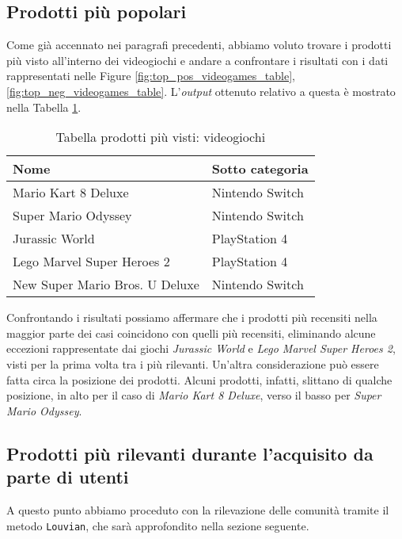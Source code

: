 	
		\subsection{Prodotti più popolari}
			Come già accennato nei paragrafi precedenti, abbiamo voluto trovare i prodotti più visto all'interno dei videogiochi e andare a confrontare i risultati con i dati rappresentati nelle Figure \ref{fig:top_pos_videogames_table}, \ref{fig:top_neg_videogames_table}. L'\textit{output} ottenuto relativo a questa è mostrato nella Tabella \ref{tab:top-five-videogames-network}.
			
			\begin{table} [H]
				\caption{Tabella prodotti più visti: videogiochi}
				\label{tab:top-five-videogames-network}
				\centering
				\begin{tabular}{ll}
					\toprule 
					\textbf{Nome} & \textbf{Sotto categoria} \\
					\midrule
					Mario Kart 8 Deluxe & Nintendo Switch \\
					Super Mario Odyssey & Nintendo Switch \\
					Jurassic World & PlayStation 4 \\
					Lego Marvel Super Heroes 2 & PlayStation 4 \\
					New Super Mario Bros. U Deluxe & Nintendo Switch \\
					\bottomrule
				\end{tabular}
			\end{table}
			
			Confrontando i risultati possiamo affermare che i prodotti più recensiti nella maggior parte dei casi coincidono con quelli più recensiti, eliminando alcune eccezioni rappresentate dai giochi \textit{Jurassic World} e \textit{Lego Marvel Super Heroes 2}, visti per la prima volta tra i più rilevanti. Un'altra considerazione può essere fatta circa la posizione dei prodotti. Alcuni prodotti, infatti, slittano di qualche posizione, in alto per il caso di \textit{Mario Kart 8 Deluxe}, verso il basso per \textit{Super Mario Odyssey}.
		
		\subsection{Prodotti più rilevanti durante l'acquisito da parte di utenti}
			A questo punto abbiamo proceduto con la rilevazione delle comunità tramite il metodo \verb|Louvian|, che sarà approfondito nella sezione seguente.
		
